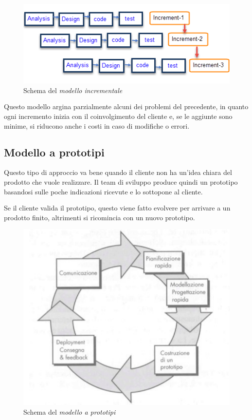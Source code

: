 \documentclass[12pt, a4paper]{report}
\theoremstyle{def}
\theoremstyle{definition}
\begin{document}
\begin{figure}[h]
    \centering
    \includegraphics[width=\textwidth]{modello-incrementale.png}
    \caption{Schema del \emph{modello incrementale}}
\end{figure}\noindent
Questo modello argina parzialmente alcuni dei problemi del precedente, in quanto
ogni incremento inizia con il coinvolgimento del cliente e, se le aggiunte sono
minime, si riducono anche i costi in caso di modifiche o errori.

\subsection{Modello a prototipi}
Questo tipo di approccio va bene quando il cliente non ha un'idea chiara del
prodotto che vuole realizzare. Il team di sviluppo produce quindi un prototipo
basandosi sulle poche indicazioni ricevute e lo sottopone al cliente.

Se il cliente valida il prototipo, questo viene fatto evolvere per arrivare a
un prodotto finito, altrimenti si ricomincia con un nuovo prototipo.

\begin{figure}[ht]
    \centering
    \includegraphics[scale=0.5]{modello-a-prototipi.png}
    \caption{Schema del \emph{modello a prototipi}}
\end{figure}
\end{document}

